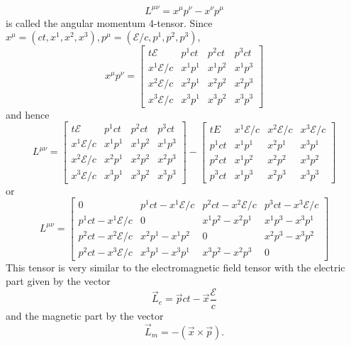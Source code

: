 \begin{enumerate}
\begin{equation}
L^{\mu\nu} = x^{\mu}p^{\nu} - x^{\nu}p^{\mu}
\end{equation}
is called the angular momentum 4-tensor. Since $x^\mu = (ct, x^1, x^2, x^3), 
p^\mu = (\mathcal{E}/c, p^1, p^2, p^3)$,
\[
x^\mu p^\nu = \begin{bmatrix}t\mathcal{E} & p^1ct & p^2ct & p^3ct \\
x^1\mathcal{E}/c & x^1p^1 & x^1p^2 & x^1p^3 \\
x^2\mathcal{E}/c & x^2p^1 & x^2p^2 & x^2p^3 \\
x^3\mathcal{E}/c & x^3p^1 & x^3p^2 & x^3p^3
\end{bmatrix}
\]
and hence
\[
L^{\mu\nu} = \begin{bmatrix}t\mathcal{E} & p^1ct & p^2ct & p^3ct \\
x^1\mathcal{E}/c & x^1p^1 & x^1p^2 & x^1p^3 \\
x^2\mathcal{E}/c & x^2p^1 & x^2p^2 & x^2p^3 \\
x^3\mathcal{E}/c & x^3p^1 & x^3p^2 & x^3p^3
\end{bmatrix} - \begin{bmatrix}tE & x^1\mathcal{E}/c & x^2\mathcal{E}/c & 
x^3\mathcal{E}/c \\
p^1ct & x^1p^1 & x^2p^1 & x^3p^1 \\
p^2ct & x^1p^2 & x^2p^2 & x^3p^2 \\
p^3ct & x^1p^3 & x^2p^3 & x^3p^3
\end{bmatrix}
\]
or
\begin{equation}\label{c2e87}
L^{\mu\nu} = \begin{bmatrix}
0 & p^1ct - x^1\mathcal{E}/c & p^2ct - x^2\mathcal{E}/c & p^3ct - 
x^3\mathcal{E}/c\\
p^1ct - x^1\mathcal{E}/c & 0 & x^1p^2 - x^2p^1 & x^1p^3 - x^3p^1 \\
p^2ct - x^2\mathcal{E}/c & x^2p^1 - x^1p^2 & 0 & x^2p^3 - x^3p^2 \\
p^2ct - x^3\mathcal{E}/c & x^3p^1 - x^3p^1 & x^3p^2 - x^2p^3 & 0
\end{bmatrix}
\end{equation}
This tensor is very similar to the electromagnetic field tensor with the 
electric part given by the vector
\begin{equation}\label{c2e88}
\vec{L}_e = \vec{p}ct - \vec{x}\frac{\mathcal{E}}{c}
\end{equation}
and the magnetic part by the vector
\begin{equation}\label{c2e89}
\vec{L}_m = -(\vec{x} \times \vec{p}).
\end{equation}

\end{enumerate}
